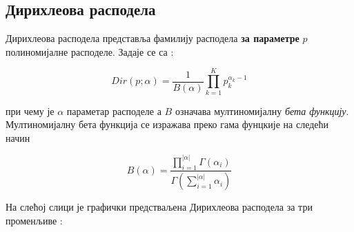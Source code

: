 \subsection{Дирихлеова расподела}

Дирихлеова расподела представља фамилију расподела \textbf{за параметре} $p$  полиномијалне расподеле. Задаје се са :

$$
Dir(p;\alpha) = \frac{1}{B(\alpha)}\prod_{k=1}^{K}p_k^{\alpha_k -1}
$$

при чему је $\alpha$ параметар расподеле а $B$ означава мултиномијалну \textit{бета функцију}. 
Мултиномијалну бета функција се изражава преко гама фунцкије на следећи начин

$$B(\alpha) = \frac{\prod_{i=1}^{|\alpha|}\Gamma(\alpha_i)}{\Gamma(\sum_{i=1}^{|\alpha|}\alpha_i)}$$


На слећој слици је графички предстваљена Дирихлеова расподела за три променљиве :

